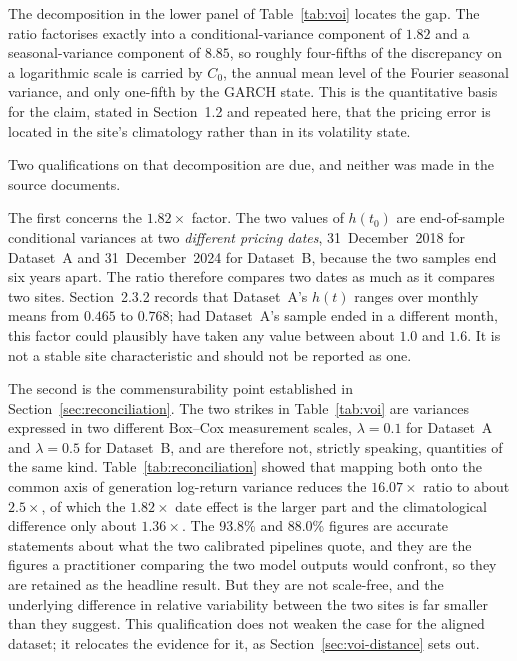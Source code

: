 \documentclass[11pt, a4paper, twoside]{article}
\begin{document}
The decomposition in the lower panel of Table~\ref{tab:voi} locates the gap. The ratio factorises exactly into a conditional-variance component of $1.82$ and a seasonal-variance component of $8.85$, so roughly four-fifths of the discrepancy on a logarithmic scale is carried by $C_0$, the annual mean level of the Fourier seasonal variance, and only one-fifth by the GARCH state. This is the quantitative basis for the claim, stated in Section~1.2 and repeated here, that the pricing error is located in the site's climatology rather than in its volatility state.

Two qualifications on that decomposition are due, and neither was made in the source documents.

The first concerns the $1.82\times$ factor. The two values of $h(t_0)$ are end-of-sample conditional variances at two \emph{different pricing dates}, 31~December~2018 for Dataset~A and 31~December~2024 for Dataset~B, because the two samples end six years apart. The ratio therefore compares two dates as much as it compares two sites. Section~2.3.2 records that Dataset~A's $h(t)$ ranges over monthly means from $0.465$ to $0.768$; had Dataset~A's sample ended in a different month, this factor could plausibly have taken any value between about $1.0$ and $1.6$. It is not a stable site characteristic and should not be reported as one.

The second is the commensurability point established in Section~\ref{sec:reconciliation}. The two strikes in Table~\ref{tab:voi} are variances expressed in two different Box--Cox measurement scales, $\lambda = 0.1$ for Dataset~A and $\lambda = 0.5$ for Dataset~B, and are therefore not, strictly speaking, quantities of the same kind. Table~\ref{tab:reconciliation} showed that mapping both onto the common axis of generation log-return variance reduces the $16.07\times$ ratio to about $2.5\times$, of which the $1.82\times$ date effect is the larger part and the climatological difference only about $1.36\times$. The 93.8\% and 88.0\% figures are accurate statements about what the two calibrated pipelines quote, and they are the figures a practitioner comparing the two model outputs would confront, so they are retained as the headline result. But they are not scale-free, and the underlying difference in relative variability between the two sites is far smaller than they suggest. This qualification does not weaken the case for the aligned dataset; it relocates the evidence for it, as Section~\ref{sec:voi-distance} sets out.
\end{document}

